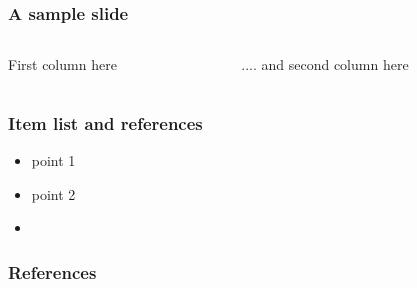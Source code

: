 \documentclass[11pt
,fragile=singleslide
]{beamer}
\begin{document}
\begin{frame}
	\frametitle{A sample slide}
	\begin{columns}
		\begin{column}{0.49\textwidth}
			First column here
		\end{column}
		\begin{column}{0.49\textwidth}
			.... and second column here
		\end{column}
		
	\end{columns}
\end{frame}


\begin{frame}
	\frametitle{Item list and references}
	\begin{itemize}
		\item point 1
		\item point 2
		\item \cite{hripcsak2015observational}
	\end{itemize}
\end{frame}


\begin{frame}[allowframebreaks]
	\frametitle{References}
	
	
\end{frame}

\end{document}
